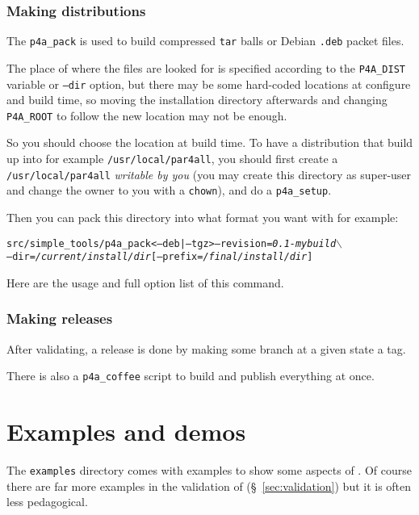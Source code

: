 \documentclass[a4paper]{article}
\begin{document}
\subsubsection{Making distributions}
\label{sec:making-distributions}

The \verb|p4a_pack| is used to build compressed \texttt{tar} balls or Debian
\texttt{.deb} packet files.

The place of where the \Apfa files are looked for is specified according
to the \verb|P4A_DIST| variable or \texttt{--dir} option, but there may be
some hard-coded locations at configure and build time, so moving the
installation directory afterwards and changing \verb|P4A_ROOT| to follow
the new location may not be enough.

So you should choose the location at build time. To have a distribution
that build up into for example \texttt{/usr/local/par4all}, you should
first create a \texttt{/usr/local/par4all} \emph{writable by you} (you may
create this directory as super-user and change the owner to you with a
\texttt{chown}), and do a \verb|p4a_setup|.

Then you can pack this directory into what format you want with for
example:
\begin{alltt}
src/simple_tools/p4a_pack <--deb|--tgz> --revision=\emph{0.1-mybuild} \(\backslash\)
  --dir=\emph{/current/install/dir} [--prefix=\emph{/final/install/dir}]
\end{alltt}

Here are the usage and full option list of this command.




\subsubsection{Making releases}
\label{sec:releases}

After validating, a release is done by making some branch at a given state
a tag.

There is also a \verb|p4a_coffee| script to build and publish everything
at once.




\section{Examples and demos}
\label{sec:examples-demos}

The \texttt{examples} directory comes with examples to show some aspects
of \Apfa. Of course there are far more examples in the validation of \Apfa
(\S~\ref{sec:validation}) but it is often less pedagogical.
\end{document}
